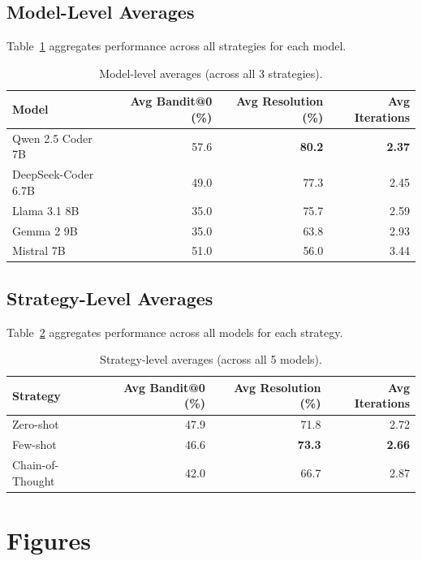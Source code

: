 \documentclass[12pt,a4paper]{article}
\begin{document}
\subsection{Model-Level Averages}
Table~\ref{tab:model_avg} aggregates performance across all strategies for each model.

\begin{table}[H]
\centering
\caption{Model-level averages (across all 3 strategies).}
\label{tab:model_avg}
\begin{tabular}{lrrr}
\toprule
\textbf{Model} & \textbf{Avg Bandit@0 (\%)} & \textbf{Avg Resolution (\%)} & \textbf{Avg Iterations} \\
\midrule
Qwen 2.5 Coder 7B     & 57.6 & \textbf{80.2} & \textbf{2.37} \\
DeepSeek-Coder 6.7B   & 49.0 & 77.3 & 2.45 \\
Llama 3.1 8B          & 35.0 & 75.7 & 2.59 \\
Gemma 2 9B            & 35.0 & 63.8 & 2.93 \\
Mistral 7B            & 51.0 & 56.0 & 3.44 \\
\bottomrule
\end{tabular}
\end{table}

\subsection{Strategy-Level Averages}
Table~\ref{tab:strategy_avg} aggregates performance across all models for each strategy.

\begin{table}[H]
\centering
\caption{Strategy-level averages (across all 5 models).}
\label{tab:strategy_avg}
\begin{tabular}{lrrr}
\toprule
\textbf{Strategy} & \textbf{Avg Bandit@0 (\%)} & \textbf{Avg Resolution (\%)} & \textbf{Avg Iterations} \\
\midrule
Zero-shot        & 47.9 & 71.8 & 2.72 \\
Few-shot         & 46.6 & \textbf{73.3} & \textbf{2.66} \\
Chain-of-Thought & 42.0 & 66.7 & 2.87 \\
\bottomrule
\end{tabular}
\end{table}

\section{Figures}
\label{sec:figures}
\end{document}
